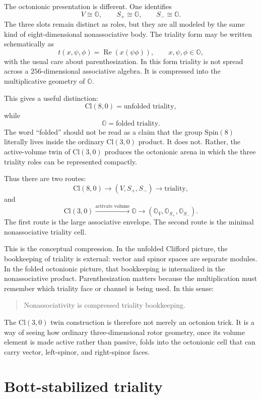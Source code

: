 \documentclass[11pt]{article}
\newcommand{\Cl}{\mathrm{Cl}}
\begin{document}
The octonionic presentation is different. One identifies
\[
V\cong \mathbb O,
\qquad
S_+\cong \mathbb O,
\qquad
S_-\cong \mathbb O.
\]
The three slots remain distinct as roles, but they are all modeled by the same
kind of eight-dimensional nonassociative body. The triality form may be written
schematically as
\[
t(x,\psi,\phi)=\operatorname{Re}(x(\psi\phi)),
\qquad
x,\psi,\phi\in\mathbb O,
\]
with the usual care about parenthesization. In this form triality is not spread
across a $256$-dimensional associative algebra. It is compressed into the
multiplicative geometry of $\mathbb O$.

This gives a useful distinction:
\[
\Cl(8,0)=\text{unfolded triality},
\]
while
\[
\mathbb O=\text{folded triality}.
\]
The word ``folded'' should not be read as a claim that the group
$\mathrm{Spin}(8)$ literally lives inside the ordinary $\Cl(3,0)$ product. It
does not. Rather, the active-volume twin of $\Cl(3,0)$ produces the octonionic
arena in which the three triality roles can be represented compactly.

Thus there are two routes:
\[
\Cl(8,0)
\longrightarrow
(V,S_+,S_-)
\longrightarrow
\text{triality},
\]
and
\[
\Cl(3,0)
\xrightarrow{\text{activate volume}}
\mathbb O
\longrightarrow
(\mathbb O_V,\mathbb O_{S_+},\mathbb O_{S_-}).
\]
The first route is the large associative envelope. The second route is the
minimal nonassociative triality cell.

This is the conceptual compression. In the unfolded Clifford picture, the
bookkeeping of triality is external: vector and spinor spaces are separate
modules. In the folded octonionic picture, that bookkeeping is internalized in
the nonassociative product. Parenthesization matters because the multiplication
must remember which triality face or channel is being used. In this sense:
\begin{quote}
Nonassociativity is compressed triality bookkeeping.
\end{quote}

The $\Cl(3,0)$ twin construction is therefore not merely an octonion trick. It
is a way of seeing how ordinary three-dimensional rotor geometry, once its
volume element is made active rather than passive, folds into the octonionic
cell that can carry vector, left-spinor, and right-spinor faces.

\section{Bott-stabilized triality}
\end{document}
